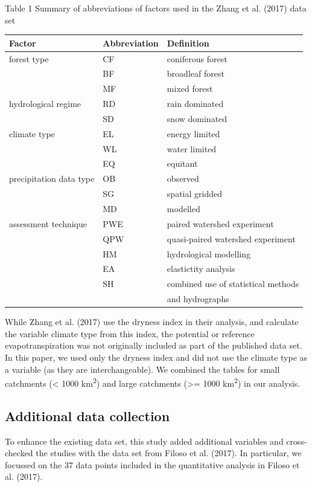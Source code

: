 \documentclass[]{elsarticle} %
\begin{document}
Table 1 Summary of abbreviations of factors used in the Zhang et al. (2017) data set

\begin{longtable}[]{@{}lll@{}}
\toprule
Factor & Abbreviation & Definition \\
\midrule
\endhead
forest type & CF & coniferous forest \\
& BF & broadleaf forest \\
& MF & mixed forest \\
hydrological regime & RD & rain dominated \\
& SD & snow dominated \\
climate type & EL & energy limited \\
& WL & water limited \\
& EQ & equitant \\
precipitation data type & OB & observed \\
& SG & spatial gridded \\
& MD & modelled \\
assessment technique & PWE & paired watershed experiment \\
& QPW & quasi-paired watershed experiment \\
& HM & hydrological modelling \\
& EA & elastictity analysis \\
& SH & combined use of statistical methods \\
& & and hydrographs \\
\bottomrule
\end{longtable}

While Zhang et al. (2017) use the dryness index in their analysis, and calculate the variable climate type from this index, the potential or reference evapotranspiration was not originally included as part of the published data set. In this paper, we used only the dryness index and did not use the climate type as a variable (as they are interchangeable).
We combined the tables for small catchments (\textless{} 1000 km\textsuperscript{2}) and large catchments (\textgreater= 1000 km\textsuperscript{2}) in our analysis.

\hypertarget{additional-data-collection}{%
\subsection{Additional data collection}\label{additional-data-collection}}

To enhance the existing data set, this study added additional variables and cross-checked the studies with the data set from Filoso et al. (2017). In particular, we focussed on the 37 data points included in the quantitative analysis in Filoso et al. (2017).
\end{document}
